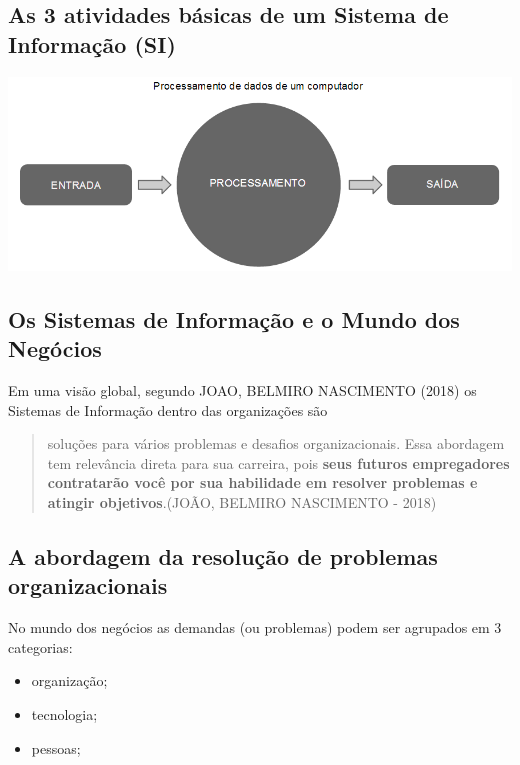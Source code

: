 \documentclass[
]{book}
\begin{document}
\subsection{As 3 atividades básicas de um Sistema de Informação (SI)}\label{as-3-atividades-buxe1sicas-de-um-sistema-de-informauxe7uxe3o-si}

\includegraphics{images/processamento-dados-computador.png}

\subsection{Os Sistemas de Informação e o Mundo dos Negócios}\label{os-sistemas-de-informauxe7uxe3o-e-o-mundo-dos-neguxf3cios}

Em uma visão global, segundo JOAO, BELMIRO NASCIMENTO (2018) os Sistemas de Informação dentro das organizações são

\begin{quote}
soluções para vários problemas e desafios organizacionais. Essa abordagem tem relevância direta para sua carreira, pois \textbf{seus futu­ros empregadores contratarão você por sua habilidade em resolver problemas e atingir objetivos}.(JOÃO, BELMIRO NASCIMENTO - 2018)
\end{quote}

\subsection{A abordagem da resolução de problemas organizacionais}\label{a-abordagem-da-resoluuxe7uxe3o-de-problemas-organizacionais}

No mundo dos negócios as demandas (ou problemas) podem ser agrupados em 3 categorias:

\begin{itemize}
\item
  organização;
\item
  tecnologia;
\item
  pessoas;
\end{itemize}
\end{document}
